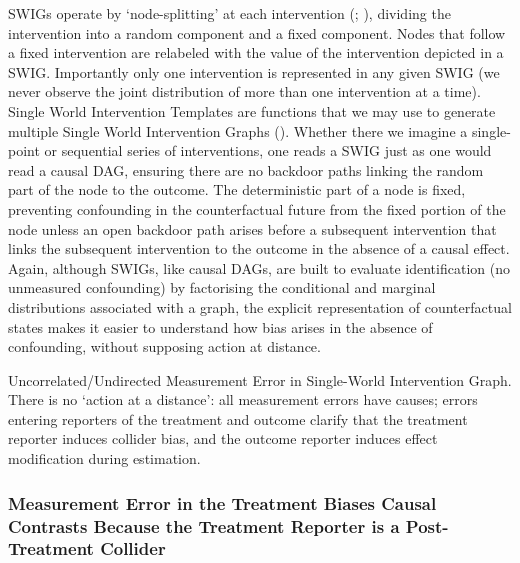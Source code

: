 \documentclass[
  single column]{article}
\begin{document}
SWIGs operate by `node-splitting' at each intervention
(;
), dividing
the intervention into a random component and a fixed component. Nodes
that follow a fixed intervention are relabeled with the value of the
intervention depicted in a SWIG. Importantly only one intervention is
represented in any given SWIG (we never observe the joint distribution
of more than one intervention at a time). Single World Intervention
Templates are functions that we may use to generate multiple Single
World Intervention Graphs
().
Whether there we imagine a single-point or sequential series of
interventions, one reads a SWIG just as one would read a causal DAG,
ensuring there are no backdoor paths linking the random part of the node
to the outcome. The deterministic part of a node is fixed, preventing
confounding in the counterfactual future from the fixed portion of the
node unless an open backdoor path arises before a subsequent
intervention that links the subsequent intervention to the outcome in
the absence of a causal effect. Again, although SWIGs, like causal DAGs,
are built to evaluate identification (no unmeasured confounding) by
factorising the conditional and marginal distributions associated with a
graph, the explicit representation of counterfactual states makes it
easier to understand how bias arises in the absence of confounding,
without supposing action at distance.

\begin{table}

\caption{\label{tbl-tblme}Uncorrelated/Undirected Measurement Error in
Single-World Intervention Graph. There is no `action at a distance': all
measurement errors have causes; errors entering reporters of the
treatment and outcome clarify that the treatment reporter induces
collider bias, and the outcome reporter induces effect modification
during estimation.}

\centering{

\tblme

}

\end{table}%

\subsubsection{Measurement Error in the Treatment Biases Causal
Contrasts Because the Treatment Reporter is a Post-Treatment
Collider}\label{measurement-error-in-the-treatment-biases-causal-contrasts-because-the-treatment-reporter-is-a-post-treatment-collider}
\end{document}
